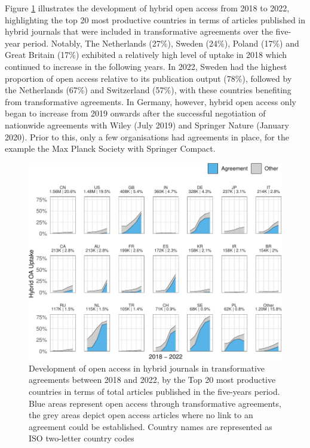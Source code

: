\documentclass[a4paper,man,floatsintext,longtable,noextraspace,12pt]{apa6}
\begin{document}
Figure \ref{fig:country_top_20_plot} illustrates the development of
hybrid open access from 2018 to 2022, highlighting the top 20 most
productive countries in terms of articles published in hybrid journals
that were included in transformative agreements over the five-year
period. Notably, The Netherlands (27\%), Sweden (24\%), Poland (17\%)
and Great Britain (17\%) exhibited a relatively high level of uptake in
2018 which continued to increase in the following years. In 2022, Sweden
had the highest proportion of open access relative to its publication
output (78\%), followed by the Netherlands (67\%) and Switzerland
(57\%), with these countries benefiting from transformative agreements.
In Germany, however, hybrid open access only began to increase from 2019
onwards after the successful negotiation of nationwide agreements with
Wiley (July 2019) and Springer Nature (January 2020). Prior to this,
only a few organisations had agreements in place, for the example the
Max Planck Society with Springer Compact.

\begin{figure}[ht!]

{\centering \includegraphics[width=0.99\linewidth,]{fig/country_top_20_plot-1} 

}

\caption{Development of open access in hybrid journals in transformative agreements between 2018 and 2022, by the Top 20 most productive countries in terms of total articles published in the five-years period. Blue areas represent open access through transformative agreements, the grey areas depict open access articles where no link to an agreement could be established. Country names are represented as ISO two-letter country codes}\label{fig:country_top_20_plot}
\end{figure}
\end{document}
